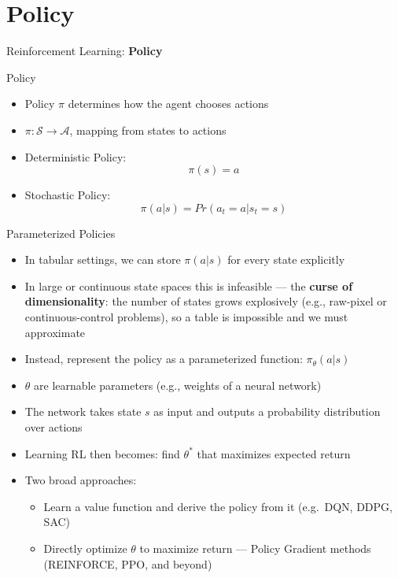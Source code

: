 \section{Policy}
\begin{frame}{}
    \LARGE Reinforcement Learning: \textbf{Policy}
\end{frame}

\begin{frame}{Policy}
\begin{itemize}
    \item Policy $\pi$ determines how the agent chooses actions
    \item $\pi : \mathcal{S} \rightarrow \mathcal{A}$, mapping from states to actions
    \item Deterministic Policy: $$\pi(s) = a$$
    \item Stochastic Policy: $$\pi(a|s) = Pr(a_t = a | s_t = s)$$
\end{itemize}
    
\end{frame}

\begin{frame}{Parameterized Policies}
\begin{itemize}
    \item In tabular settings, we can store $\pi(a|s)$ for every state explicitly
    \item In large or continuous state spaces this is infeasible --- the \textbf{curse of dimensionality}: the number of states grows explosively (e.g., raw-pixel or continuous-control problems), so a table is impossible and we must approximate
    \item Instead, represent the policy as a parameterized function: $\pi_\theta(a|s)$
    \item $\theta$ are learnable parameters (e.g., weights of a neural network)
    \item The network takes state $s$ as input and outputs a probability distribution over actions
    \item Learning RL then becomes: find $\theta^*$ that maximizes expected return
    \item Two broad approaches:
    \begin{itemize}
        \item Learn a value function and derive the policy from it (e.g.\ DQN, DDPG, SAC)
        \item Directly optimize $\theta$ to maximize return --- Policy Gradient methods (REINFORCE, PPO, and beyond)
    \end{itemize}
\end{itemize}
\end{frame}